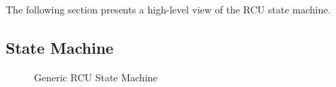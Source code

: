 The following section presents a high-level view of the RCU state machine.

\subsection{State Machine}
\label{app:rcuimpl:rcutree:State Machine}

\begin{figure}[htbp]
\begin{center}
\end{center}
\caption{Generic RCU State Machine}
\label{fig:app:rcuimpl:rcutree:Generic RCU State Machine}
\end{figure}

